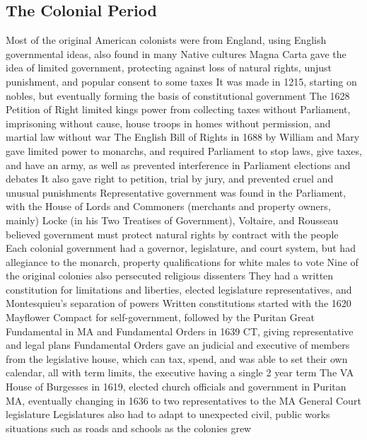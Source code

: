 \documentclass[11 pt, twoside]{article}
\newenvironment{outline*}
{
	\begin{outline}[enumerate]
	}
	{\end{outline}
}
\begin{document}
\subsection{The Colonial Period}
\begin{outline*}
\1 Most of the original American colonists were from England, using English governmental ideas, also found in many Native cultures
\2 Magna Carta gave the idea of limited government, protecting against loss of natural rights, unjust punishment, and popular consent to some taxes
\2 It was made in 1215, starting on nobles, but eventually forming the basis of constitutional government
\2 The 1628 Petition of Right limited kings power from collecting taxes without Parliament, imprisoning without cause, house troops in homes without permission, and martial law without war
\1 The English Bill of Rights in 1688 by William and Mary gave limited power to monarchs, and required Parliament to stop laws, give taxes, and have an army, as well as prevented interference in Parliament elections and debates
\2 It also gave right to petition, trial by jury, and prevented cruel and unusual punishments
\1 Representative government was found in the Parliament, with the House of Lords and Commoners (merchants and property owners, mainly)
\1 Locke (in his Two Treatises of Government), Voltaire, and Rousseau believed government must protect natural rights by contract with the people
\1 Each colonial government had a governor, legislature, and court system, but had allegiance to the monarch, property qualifications for white males to vote
\2 Nine of the original colonies also persecuted religious dissenters
\2 They had a written constitution for limitations and liberties, elected legislature representatives, and Montesquieu’s separation of powers
\2 Written constitutions started with the 1620 Mayflower Compact for self-government, followed by the Puritan Great Fundamental in MA and Fundamental Orders in 1639 CT, giving representative and legal plans
\2 Fundamental Orders gave an judicial and executive of members from the legislative house, which can tax, spend, and was able to set their own calendar, all with term limits, the executive having a single 2 year term
\2 The VA House of Burgesses in 1619, elected church officials and government in Puritan MA, eventually changing in 1636 to two representatives to the MA General Court legislature
\2 Legislatures also had to adapt to unexpected civil, public works situations such as roads and schools as the colonies grew
\end{outline*}
\end{document}

